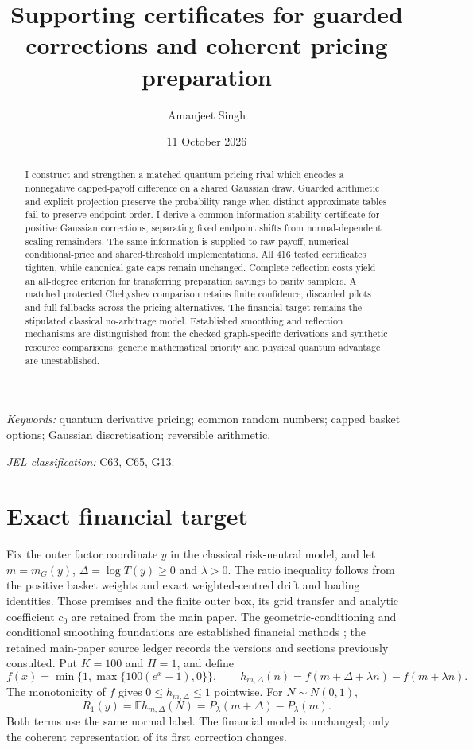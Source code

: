 \documentclass[11pt]{article}
\title{Supporting certificates for guarded corrections and coherent pricing preparation}
\author{Amanjeet Singh}
\date{11 October 2026}
\newcommand{\E}{\mathbb E}
\begin{document}
\maketitle
\begin{abstract}
I construct and strengthen a matched quantum pricing rival which encodes a
nonnegative capped-payoff difference on a shared Gaussian draw. Guarded
arithmetic and explicit projection preserve the probability range when
distinct approximate tables fail to preserve endpoint order. I derive a
common-information stability certificate for positive Gaussian corrections,
separating fixed endpoint shifts from normal-dependent scaling remainders.
The same information is supplied to raw-payoff, numerical conditional-price
and shared-threshold implementations. All 416 tested certificates tighten,
while canonical gate caps remain unchanged. Complete reflection costs yield
an all-degree criterion for transferring preparation savings to parity
samplers. A matched protected Chebyshev comparison retains finite confidence,
discarded pilots and full fallbacks across the pricing alternatives.
The financial target remains the stipulated classical no-arbitrage model.
Established smoothing and reflection mechanisms are distinguished from the
checked graph-specific derivations and synthetic resource comparisons;
generic mathematical priority and physical quantum advantage are unestablished.
\end{abstract}
\smallskip\noindent\textit{Keywords:} quantum derivative pricing; common random numbers;
capped basket options; Gaussian discretisation; reversible arithmetic.\par
\smallskip\noindent\textit{JEL classification:} C63, C65, G13.\par

\section{Exact financial target}

Fix the outer factor coordinate $y$ in the classical risk-neutral model,
and let $m=m_G(y)$, $\Delta=\log T(y)\geq0$ and $\lambda>0$.
The ratio inequality follows from the positive basket weights and exact
weighted-centred drift and loading identities. Those premises and the
finite outer box, its grid transfer and analytic coefficient $c_0$ are
retained from the main paper. The geometric-conditioning and conditional
smoothing foundations are established financial methods
\citep{curran,bayer}; the retained main-paper source ledger records the
versions and sections previously consulted. Put $K=100$ and $H=1$, and define
\begin{equation}
 f(x)=\min\{1,\max\{100(e^x-1),0\}\},\qquad
 h_{m,\Delta}(n)=f(m+\Delta+\lambda n)-f(m+\lambda n).
\end{equation}
The monotonicity of $f$ gives $0\leq h_{m,\Delta}\leq1$ pointwise.
For $N\sim N(0,1)$,
\begin{equation}
 R_1(y)=\E h_{m,\Delta}(N)
       =P_\lambda(m+\Delta)-P_\lambda(m).
\end{equation}
Both terms use the same normal label. The financial model is unchanged;
only the coherent representation of its first correction changes.
\end{document}
